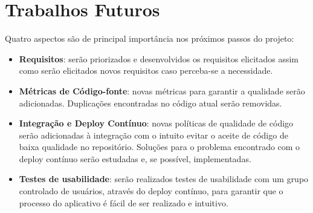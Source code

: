 \section{Trabalhos Futuros}

Quatro aspectos são de principal importância nos próximos passos do projeto:

\begin{itemize}
    \item \textbf{Requisitos}: serão priorizados e desenvolvidos os requisitos elicitados assim como serão elicitados novos requisitos caso perceba-se a necessidade.
    \item \textbf{Métricas de Código-fonte}: novas métricas para garantir a qualidade serão adicionadas. Duplicações encontradas no código atual serão removidas.
    \item \textbf{Integração e Deploy Contínuo}: novas políticas de qualidade de código serão adicionadas à integração com o intuito evitar o aceite de código de baixa qualidade no repositório. Soluções para o problema encontrado com o deploy contínuo serão estudadas e, se possível, implementadas.
    \item \textbf{Testes de usabilidade}: serão realizados testes de usabilidade com um grupo controlado de usuários, através do deploy contínuo, para garantir que o processo do aplicativo é fácil de ser realizado e intuitivo.
\end{itemize}
